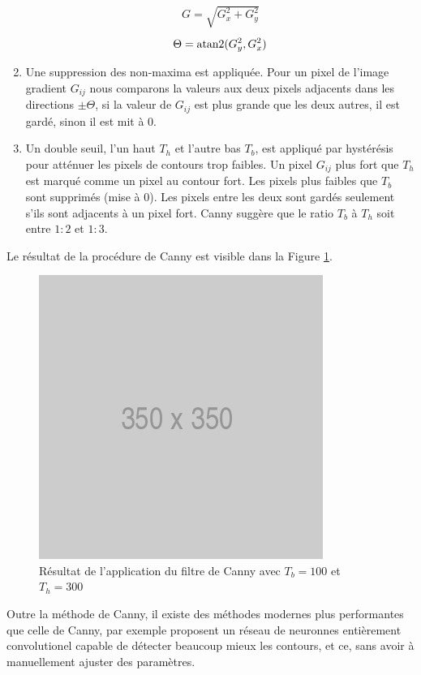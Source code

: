 \begin{enumerate}
  \begin{align}
    G = \sqrt{G_x^2 + G_y^2}
  \end{align}
  \begin{align}
    \Theta = \operatorname{atan2}(G_y^2, G_x^2)
  \end{align}
  \item Une suppression des non-maxima est appliquée. Pour un pixel de l'image gradient $G_{ij}$ nous comparons la valeurs aux deux pixels adjacents dans les directions $\pm\Theta$, si la valeur de $G_{ij}$ est plus grande que les deux autres, il est gardé, sinon il est mit à $0$.
  \item Un double seuil, l'un haut $T_h$ et l'autre bas $T_b$, est appliqué par hystérésis pour atténuer les pixels de contours trop faibles. Un pixel $G_{ij}$ plus fort que $T_h$ est marqué comme un pixel au contour fort. Les pixels plus faibles que $T_b$ sont supprimés (mise à $0$). Les pixels entre les deux sont gardés seulement s'ils sont adjacents à un pixel fort. Canny suggère que le ratio $T_b$ à $T_h$ soit entre $1:2$ et $1:3$.
\end{enumerate}

Le résultat de la procédure de Canny est visible dans la Figure \ref{fig:canny}.

\begin{figure}[htp]
  \centering
  \includegraphics[width=0.5\linewidth]{images/placeholder.png}
  \caption{Résultat de l'application du filtre de Canny avec $T_b = 100$ et $T_h = 300$}
  \label{fig:canny}
\end{figure}

Outre la méthode de Canny, il existe des méthodes modernes plus performantes que celle de Canny, par exemple \citep{Xie2015} proposent un réseau de neuronnes entièrement convolutionel capable de détecter beaucoup mieux les contours, et ce, sans avoir à manuellement ajuster des paramètres.

